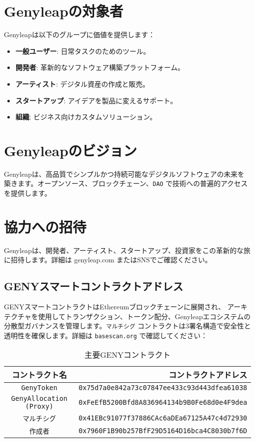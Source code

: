 \documentclass[a4paper,12pt,openany]{book}
\begin{document}
\chapter{Genyleapの対象者}
Genyleapは以下のグループに価値を提供します：
\begin{itemize}
    \item \textbf{一般ユーザー}: 日常タスクのためのツール。
    \item \textbf{開発者}: 革新的なソフトウェア構築プラットフォーム。
    \item \textbf{アーティスト}: デジタル資産の作成と販売。
    \item \textbf{スタートアップ}: アイデアを製品に変えるサポート。
    \item \textbf{組織}: ビジネス向けカスタムソリューション。
\end{itemize}

\chapter{Genyleapのビジョン}
Genyleapは、高品質でシンプルかつ持続可能なデジタルソフトウェアの未来を築きます。オープンソース、ブロックチェーン、\texttt{DAO} で技術への普遍的アクセスを提供します。

\chapter{協力への招待}
Genyleapは、開発者、アーティスト、スタートアップ、投資家をこの革新的な旅に招待します。詳細は genyleap.com またはSNSでご確認ください。

\section*{GENYスマートコントラクトアドレス}
GENYスマートコントラクトはEthereumブロックチェーンに展開され、 アーキテクチャを使用してトランザクション、トークン配分、Genyleapエコシステムの分散型ガバナンスを管理します。\texttt{マルチシグ} コントラクトは3署名構造で安全性と透明性を確保します。詳細は \texttt{basescan.org} で確認してください：

\begin{table}[h]
\centering
\caption*{主要GENYコントラクト}
\small
\begin{tabular}{c r}
\hline
\textbf{コントラクト名} & \textbf{コントラクトアドレス} \\
\hline
\texttt{GenyToken} & {\texttt{0x75d7a0e842a73c07847ee433c93d443dfea61038}} \\
\texttt{GenyAllocation (Proxy)} & {\texttt{0xFeEfB5200Bfd8A836964134b9B0Fe68d0e4F9dea}} \\
\texttt{マルチシグ} & {\texttt{0x41EBc91077f37886CAc6aDEa67125A47c4d72930}} \\
\texttt{作成者} & {\texttt{0x7960F1B90b257BfF29D5164D16bca4C8030b7f6D}} \\
\hline
\end{tabular}
\end{table}
\end{document}
